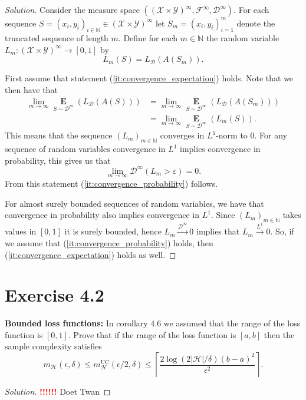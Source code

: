 \documentclass[10pt, a4paper, twoside]{amsart}
\newcommand{\N}{\ensuremath{\mathbb{N}}}
\newcommand{\Ev}{\operatorname*{\ensuremath{\mathbf{E}}}} %
\newcommand{\Fa}{\ensuremath{\mathcal{F}}} %
\newenvironment{solution}
               {\let\oldqedsymbol=\qedsymbol
                \renewcommand{\qedsymbol}{$\blacktriangleleft$}
                \begin{proof}[Solution]}
               {\end{proof}
                \renewcommand{\qedsymbol}{\oldqedsymbol}}
\newcommand{\TODO}{\textcolor{red}{\textbf{!!!!!! }}}
\begin{document}
\begin{solution}
Consider the measure space $((\mathcal{X}\times\mathcal{Y})^\infty, \Fa^{\infty}, \mathcal{D}^\infty)$.
For each sequence $S=(x_i,y_i)_{i \in \N} \in (\mathcal{X}\times\mathcal{Y})^\infty$
let $S_m=(x_i,y_i)_{i=1}^{m}$ denote the truncated sequence of length $m$.
Define for each $m \in \N$ the random variable $L_m:(\mathcal{X}\times\mathcal{Y})^\infty \to [0,1]$ by
\begin{equation*}
 L_m(S)=L_{\mathcal{D}}(A(S_m)).
\end{equation*}

First assume that statement (\ref{it:convergence_expectation}) holds. 
Note that we then have that 
\begin{align*}
 \lim_{m\to \infty}\Ev_{S\sim \mathcal{D}^{m}}(L_{\mathcal{D}}(A(S))) &= 
 \lim_{m\to \infty}\Ev_{S\sim \mathcal{D}^{\infty}}(L_{\mathcal{D}}(A(S_m))) \\
 & = \lim_{m\to \infty}\Ev_{S\sim \mathcal{D}^{\infty}}(L_m(S)).
\end{align*}
This means that the sequence $(L_m)_{m \in \N}$ converges in $L^1$-norm to $0$.
For any sequence of random variables convergence in $L^1$ implies convergence in probability, this gives us that
\begin{equation*}
 \lim_{m\to \infty}\mathcal{D}^{\infty}(L_m>\varepsilon)=0.
\end{equation*}
From this statement (\ref{it:convergence_probability}) follows.

For almost surely bounded sequences of random variables, we have that convergence in probability also implies convergence in 
$L^1$. Since $(L_m)_{m\in \N}$ takes values in $[0,1]$ it is surely bounded, hence $L_m \stackrel{\mathcal{D}^{\infty}}{\to} 0$ implies that $L_m \stackrel{L^1}{\to} 0$. So, if we assume that (\ref{it:convergence_probability}) holds, then (\ref{it:convergence_expectation}) holds as well.
\end{solution}

\section*{Exercise 4.2}
\textbf{Bounded loss functions:}
In corollary 4.6 we assumed that the range of the loss function is $[0,1]$. Prove that if the range of the loss function is $[a,b]$ then the sample complexity satisfies
\begin{equation*}
  m_{\mathcal{H}}(\epsilon , \delta) \leq m_{\mathcal{H}}^{\text{UC}}(\epsilon /2, \delta)
  \leq \left\lceil \frac{2\log (2|\mathcal{H}|/\delta) (b-a)^2}{\epsilon^2} \right\rceil .
\end{equation*}
\begin{solution}
  \TODO Doet Twan
\end{solution}
\end{document}
